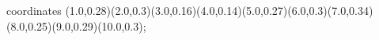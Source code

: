 					coordinates { (1.0,0.28)(2.0,0.3)(3.0,0.16)(4.0,0.14)(5.0,0.27)(6.0,0.3)(7.0,0.34)(8.0,0.25)(9.0,0.29)(10.0,0.3)};